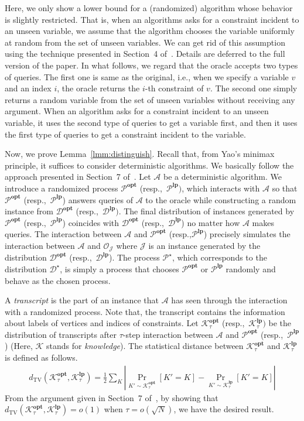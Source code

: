 \documentclass[letterpaper, 11pt]{article}
\newcommand{\calA}{\mathcal{A}}
\newcommand{\calD}{\mathcal{D}}
\newcommand{\calJ}{\mathcal{J}}
\newcommand{\calO}{\mathcal{O}}
\newcommand{\calP}{\mathcal{P}}
\newcommand{\calK}{\mathcal{K}}
\newcommand{\dtv}{d_{\mathrm{TV}}}
\newcommand{\lp}{\mathbf{lp}}
\newcommand{\opt}{\mathbf{opt}}
\begin{document}
Here, we only show a lower bound for a (randomized) algorithm whose behavior is slightly restricted.
That is, when an algorithms asks for a constraint incident to an unseen variable, 
we assume that the algorithm chooses the variable uniformly at random from the set of unseen variables.
We can get rid of this assumption using the technique presented in Section~4 of~\cite{GT03}.
Details are deferred to the full version of the paper.
In what follows, we regard that the oracle accepts two types of queries.
The first one is same as the original, i.e., when we specify a variable $v$ and an index $i$, the oracle returns the $i$-th constraint of $v$.
The second one simply returns a random variable from the set of unseen variables without receiving any argument.
When an algorithm asks for a constraint incident to an unseen variable,
it uses the second type of queries to get a variable first, 
and then it uses the first type of queries to get a constraint incident to the variable.

Now, we prove Lemma~\ref{lmm:distinguish}.
Recall that, from Yao's minimax principle, it suffices to consider deterministic algorithms.
We basically follow the approach presented in Section~7 of~\cite{GR08}.
Let $\calA$ be a deterministic algorithm.
We introduce a randomized process $\calP^{\opt}$ (resp.,~$\calP^{\lp})$, 
which interacts with $\calA$ so that $\calP^{\opt}$ (resp.,~$\calP^{\lp}$) answers queries of $\calA$ to the oracle while constructing a random instance from $\calD^{\opt}$ (resp.,~$\calD^{\lp})$.
The final distribution of instances generated by $\calP^{\opt}$ (resp.,~$\calP^{\lp}$) coincides with $\calD^{\opt}$ (resp.,~$\calD^{\lp}$) no matter how $\calA$ makes queries.
The interaction between $\calA$ and $\calP^{\opt}$ (resp.,$\calP^{\lp}$) precisely simulates the interaction between $\calA$ and $\calO_{\calJ}$ where $\calJ$ is an instance generated by the distribution $\calD^{\opt}$ (resp.,~$\calD^{\lp}$).
The process $\calP^\star$, which corresponds to the distribution $\calD^\star$,
is simply a process that chooses $\calP^{\opt}$ or $\calP^{\lp}$ randomly and behave as the chosen process.

A \textit{transcript} is the part of an instance that $\calA$ has seen through the interaction with a randomized process.
Note that, the transcript contains the information about labels of vertices and indices of constraints.
Let $\calK_{\tau}^{\opt}$ (resp.,~$\calK_{\tau}^{\lp})$ be the distribution of transcripts after $\tau$-step interaction between $\calA$ and $\calP^{\opt}$ (resp.,~$\calP^{\lp}$) (Here, $\calK$ stands for \textit{knowledge}).
The statistical distance between $\calK_{\tau}^{\opt}$ and $\calK_{\tau}^{\lp}$ is defined as follows.
\begin{eqnarray*}
  \dtv(\calK_{\tau}^{\opt},\calK_{\tau}^{\lp}) = \frac{1}{2}\sum_{K}\left| \Pr_{K' \sim \calK_{\tau}^{\opt}}[K' = K] - \Pr_{K' \sim \calK_{\tau}^{\lp}}[K' = K] \right|
\end{eqnarray*}
From the argument given in Section~7 of~\cite{GR08},
by showing that $\dtv(\calK_{\tau}^{\opt},\calK_{\tau}^{\lp}) = o(1)$ when $\tau=o(\sqrt{N})$,
we have the desired result.
\end{document}

